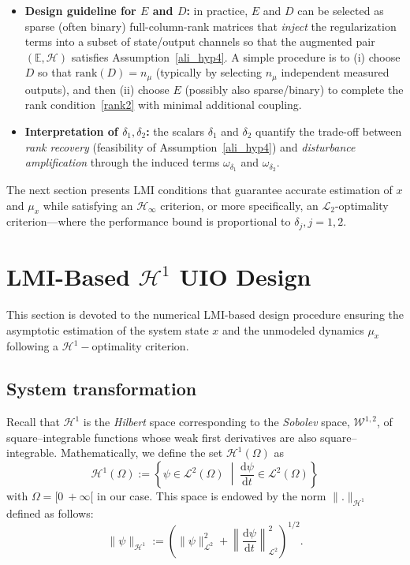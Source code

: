 \begin{itemize}
    \item \textbf{Design guideline for $E$ and $D$:} in practice, $E$ and $D$ can be selected as sparse (often binary) full-column-rank matrices that \emph{inject} the regularization terms into a subset of state/output channels so that the augmented pair $(\mathbb{E},\mathcal{H})$ satisfies Assumption~\ref{ali_hyp4}. A simple procedure is to (i) choose $D$ so that $\mathrm{rank}(D)=n_{\mu}$ (typically by selecting $n_{\mu}$ independent measured outputs), and then (ii) choose $E$ (possibly also sparse/binary) to complete the rank condition~\eqref{rank2} with minimal additional coupling.
    \item \textbf{Interpretation of $\delta_1,\delta_2$:} the scalars $\delta_1$ and $\delta_2$ quantify the trade-off between \emph{rank recovery} (feasibility of Assumption~\ref{ali_hyp4}) and \emph{disturbance amplification} through the induced terms $\omega_{\delta_1}$ and $\omega_{\delta_2}$.
\end{itemize}
The next section presents LMI conditions that guarantee accurate estimation of $x$ and $\mu_{x}$ while satisfying an $\mathcal{H}_{\infty}$ criterion, or more specifically, an $\mathcal{L}_{2}$-optimality criterion---where the performance bound is proportional to $\delta_{j}, j=1,2$.








\section{LMI-Based $\mathcal{H}^{1}$ UIO Design}\label{uio}
This section is devoted to the numerical LMI-based design procedure ensuring the asymptotic estimation of the system state $x$ and the unmodeled dynamics $\mu_{x}$ following a $\mathcal{H}^{1}-$optimality criterion.

\subsection{System transformation}
Recall that $\mathcal{H}^{1}$ is the {\it Hilbert} space corresponding to the {\it Sobolev} space, $\mathcal{W}^{1,2}$, of square--integrable functions whose weak first derivatives are also square--integrable. Mathematically, we define the set $\mathcal{H}^{1}\left( \Omega \right)$ as
$$
\mathcal{H}^{1}\left( \Omega \right) := \left\{ \psi \in \mathcal{L}^{2}(\Omega) \;\middle|\; \frac{\textrm{d} \psi}{\textrm{d} t} \in \mathcal{L}^{2}(\Omega) \right\}
$$
with $\Omega = [0~+\infty[$ in our case. This space is endowed by the norm $\| . \|_{\mathcal{H}^{1}}$ defined as follows:
$$
\| \psi \|_{\mathcal{H}^{1}} :=
\left( \| \psi \|_{\mathcal{L}^{2}}^2 + \left\| \frac{\textrm{d} \psi}{\textrm{d} t} \right\|_{\mathcal{L}^{2}}^2 \right)^{1/2}.
$$

